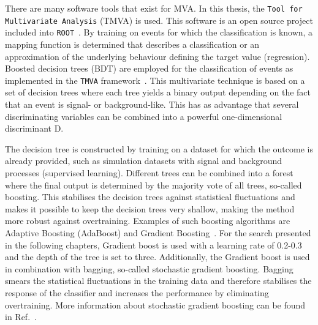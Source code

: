 There are many software tools that exist for MVA. In this thesis,  the \texttt{Tool for Multivariate Analysis} (TMVA) \cite{2007physics3039H} is used. This software is an open source project included into \texttt{ROOT}~\cite{Brun:1997pa}. 
 By training on events for which the classification is known, a mapping function is determined that describes a classification or an approximation of the underlying behaviour defining the target value (regression). Boosted decision trees (BDT) are employed for the classification of events as implemented in the \texttt{TMVA} framework~\cite{2007physics3039H}. This multivariate technique is based on a set of decision trees where each tree yields a binary output depending on the fact that an event is signal- or background-like. This has as advantage  that several discriminating variables can be combined into a powerful one-dimensional discriminant D. 
 
\newpage
The decision tree is constructed by training on a dataset for which the outcome is already provided, such as simulation datasets with signal and background processes (supervised learning). Different trees can be combined into a forest where the final output is determined by the majority vote of all trees, so-called boosting. This stabilises the decision trees against statistical fluctuations and makes it possible to keep the decision trees very shallow, making the method more robust against overtraining. Examples of such boosting algorithms are Adaptive Boosting (AdaBoost) and Gradient Boosting~\cite{2014arXiv1403.1452M}.  For the search presented in the following chapters, Gradient boost is used with a learning rate of 0.2-0.3 and the depth of the tree is set to three. Additionally, the Gradient boost is used in combination with bagging, so-called stochastic gradient boosting. Bagging smears the statistical fluctuations in the training data and therefore  stabilises the response of the classifier and increases the performance by eliminating overtraining.  More information about stochastic gradient boosting can be found in Ref.~\cite{Behnke:2013:DAH:2564838}.%

